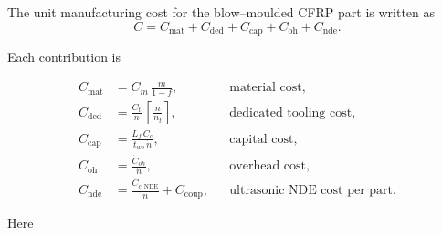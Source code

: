 \documentclass[11pt]{article}
\begin{document}
The unit manufacturing cost for the blow–moulded CFRP part is written as  
\begin{equation}
  C = C_{\text{mat}} + C_{\text{ded}} + C_{\text{cap}}
      + C_{\text{oh}} + C_{\text{nde}} .
\end{equation}

Each contribution is

\begin{align}
  C_{\text{mat}}
    &= C_m \,\frac{m}{1-f},
    &&\text{material cost,} \\
  C_{\text{ded}}
    &= \frac{C_t}{n}\,
       \left\lceil \frac{n}{n_t} \right\rceil,
    &&\text{dedicated tooling cost,} \\
  C_{\text{cap}}
    &= \frac{L_f\, C_c}{t_{wo}\,\dot{n}},
    &&\text{capital cost,} \\
  C_{\text{oh}}
    &= \frac{\dot{C}_{oh}}{\dot{n}},
    &&\text{overhead cost,} \\
  C_{\text{nde}}
    &= \frac{C_{c,\text{NDE}}}{n} + C_{\text{coup}},
    &&\text{ultrasonic NDE cost per part.}
\end{align}

Here
\end{document}
